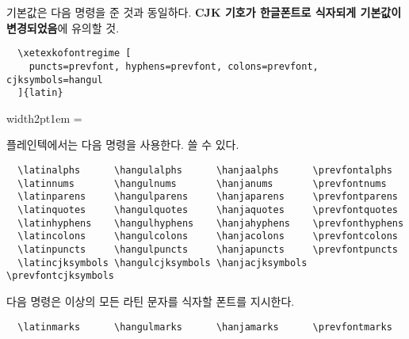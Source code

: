 \documentclass[a4paper]{article}
\def\grayvrule{\color{white!80!black}\vrule width2pt\color{black}}
\newenvironment{plaintex}
  {\par\medskip\leavevmode\hbox\bgroup\grayvrule\kern1em
    \vbox\bgroup\hsize=\dimexpr\textwidth-12pt\relax\small
  }{\egroup\egroup\par\medskip}
\def\hemph#1{\textsf{\bfseries #1}}
\begin{document}
기본값은 다음 명령을 준 것과 동일하다. \hemph{CJK 기호가 한글폰트로 식자되게
기본값이 변경되었음}에 유의할 것.
\begin{verbatim}
  \xetexkofontregime [
    puncts=prevfont, hyphens=prevfont, colons=prevfont, cjksymbols=hangul
  ]{latin}
\end{verbatim}

\begin{plaintex}
플레인텍에서는 다음 명령을 사용한다.  쓸 수 있다.
\begin{verbatim}
  \latinalphs      \hangulalphs      \hanjaalphs      \prevfontalphs
  \latinnums       \hangulnums       \hanjanums       \prevfontnums
  \latinparens     \hangulparens     \hanjaparens     \prevfontparens
  \latinquotes     \hangulquotes     \hanjaquotes     \prevfontquotes
  \latinhyphens    \hangulhyphens    \hanjahyphens    \prevfonthyphens
  \latincolons     \hangulcolons     \hanjacolons     \prevfontcolons
  \latinpuncts     \hangulpuncts     \hanjapuncts     \prevfontpuncts
  \latincjksymbols \hangulcjksymbols \hanjacjksymbols \prevfontcjksymbols
\end{verbatim}
다음 명령은 이상의 모든 라틴 문자를 식자할 폰트를 지시한다.
\begin{verbatim}
  \latinmarks      \hangulmarks      \hanjamarks      \prevfontmarks
\end{verbatim}
\end{plaintex}
\end{document}
